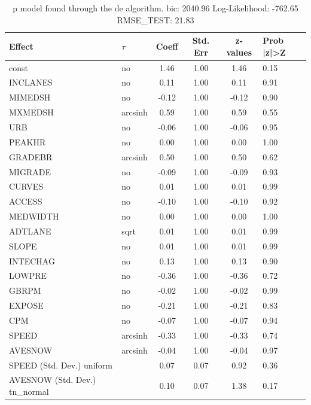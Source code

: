 \begin{table}
	\caption{p model found through the de algorithm. bic: 2040.96 Log-Likelihood: -762.65 RMSE_TEST: 21.83}
	\begin{center}
		\begin{tabular}{|l|l|c|c|c|l|}
			\hline
			Effect & $\tau$ & Coeff & Std. Err & z-values & Prob |z|>Z \\
			\hline
			const & no & 1.46 & 1.00 & 1.46 & 0.15 \\
			\hline
			INCLANES & no & 0.11 & 1.00 & 0.11 & 0.91 \\
			\hline
			MIMEDSH & no & -0.12 & 1.00 & -0.12 & 0.90 \\
			\hline
			MXMEDSH & arcsinh & 0.59 & 1.00 & 0.59 & 0.55 \\
			\hline
			URB & no & -0.06 & 1.00 & -0.06 & 0.95 \\
			\hline
			PEAKHR & no & 0.00 & 1.00 & 0.00 & 1.00 \\
			\hline
			GRADEBR & arcsinh & 0.50 & 1.00 & 0.50 & 0.62 \\
			\hline
			MIGRADE & no & -0.09 & 1.00 & -0.09 & 0.93 \\
			\hline
			CURVES & no & 0.01 & 1.00 & 0.01 & 0.99 \\
			\hline
			ACCESS & no & -0.10 & 1.00 & -0.10 & 0.92 \\
			\hline
			MEDWIDTH & no & 0.00 & 1.00 & 0.00 & 1.00 \\
			\hline
			ADTLANE & sqrt & 0.01 & 1.00 & 0.01 & 0.99 \\
			\hline
			SLOPE & no & 0.01 & 1.00 & 0.01 & 0.99 \\
			\hline
			INTECHAG & no & 0.13 & 1.00 & 0.13 & 0.90 \\
			\hline
			LOWPRE & no & -0.36 & 1.00 & -0.36 & 0.72 \\
			\hline
			GBRPM & no & -0.02 & 1.00 & -0.02 & 0.99 \\
			\hline
			EXPOSE & no & -0.21 & 1.00 & -0.21 & 0.83 \\
			\hline
			CPM & no & -0.07 & 1.00 & -0.07 & 0.94 \\
			\hline
			SPEED & arcsinh & -0.33 & 1.00 & -0.33 & 0.74 \\
			\hline
			AVESNOW & arcsinh & -0.04 & 1.00 & -0.04 & 0.97 \\
			\hline
			SPEED (Std. Dev.) uniform &  & 0.07 & 0.07 & 0.92 & 0.36 \\
			\hline
			AVESNOW (Std. Dev.) tn_normal &  & 0.10 & 0.07 & 1.38 & 0.17 \\
			\hline
		\end{tabular}
	\end{center}
\end{table}